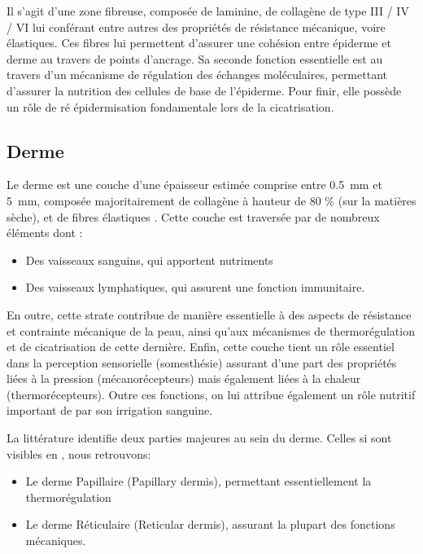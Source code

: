 \addtocounter{footnote}{1}

Il s’agit d’une zone fibreuse, composée de laminine, de collagène de type III / IV / VI lui conférant entre autres des propriétés de résistance mécanique, voire élastiques. Ces fibres lui permettent d’assurer une cohésion entre épiderme et derme au travers de points d’ancrage. Sa seconde fonction essentielle est au travers d’un mécanisme de régulation des échanges moléculaires, permettant d’assurer la nutrition des cellules de base de l’épiderme. Pour finir, elle possède un rôle de ré épidermisation fondamentale lors de la cicatrisation.\par
\clearpage

\subsection{Derme}
Le derme est une couche d’une épaisseur estimée comprise entre \SI{0,5}{\milli\metre} et \SI{5}{\milli\metre}, composée majoritairement de collagène à hauteur de 80 \% (sur la matières sèche), et de fibres élastiques \cite{McGrath2010}. Cette couche est traversée par de nombreux éléments dont : 

\begin{itemize}
\item Des vaisseaux sanguins, qui apportent nutriments
\item Des vaisseaux lymphatiques, qui assurent une fonction immunitaire.
\end{itemize}\par

En outre, cette strate contribue de manière essentielle à des aspects de résistance et contrainte mécanique de la peau, ainsi qu’aux mécanismes de thermorégulation et de cicatrisation de cette dernière. Enfin, cette couche tient un rôle essentiel dans la perception sensorielle (somesthésie) assurant d’une part des propriétés liées à la pression (mécanorécepteurs) mais également liées à la chaleur (thermorécepteurs). Outre ces fonctions, on lui attribue également un rôle nutritif important de par son irrigation sanguine.\par
La littérature identifie deux parties majeures au sein du derme. Celles si sont visibles en , nous retrouvons:
\begin{itemize}
\item Le derme Papillaire (Papillary dermis), permettant essentiellement la thermorégulation
\item Le derme Réticulaire (Reticular dermis), assurant la plupart des fonctions mécaniques.
\end{itemize}\par

